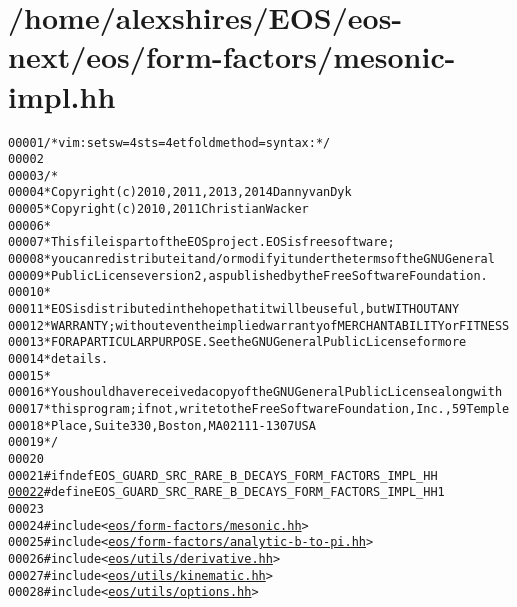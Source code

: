 \hypertarget{mesonic-impl_8hh_source}{
\section{/home/alexshires/EOS/eos-\/next/eos/form-\/factors/mesonic-\/impl.hh}
}


\begin{footnotesize}\begin{alltt}
00001 \textcolor{comment}{/* vim: set sw=4 sts=4 et foldmethod=syntax : */}
00002 
00003 \textcolor{comment}{/*}
00004 \textcolor{comment}{ * Copyright (c) 2010, 2011, 2013, 2014 Danny van Dyk}
00005 \textcolor{comment}{ * Copyright (c) 2010, 2011 Christian Wacker}
00006 \textcolor{comment}{ *}
00007 \textcolor{comment}{ * This file is part of the EOS project. EOS is free software;}
00008 \textcolor{comment}{ * you can redistribute it and/or modify it under the terms of the GNU General}
00009 \textcolor{comment}{ * Public License version 2, as published by the Free Software Foundation.}
00010 \textcolor{comment}{ *}
00011 \textcolor{comment}{ * EOS is distributed in the hope that it will be useful, but WITHOUT ANY}
00012 \textcolor{comment}{ * WARRANTY; without even the implied warranty of MERCHANTABILITY or FITNESS}
00013 \textcolor{comment}{ * FOR A PARTICULAR PURPOSE.  See the GNU General Public License for more}
00014 \textcolor{comment}{ * details.}
00015 \textcolor{comment}{ *}
00016 \textcolor{comment}{ * You should have received a copy of the GNU General Public License along with}
00017 \textcolor{comment}{ * this program; if not, write to the Free Software Foundation, Inc., 59 Temple}
00018 \textcolor{comment}{ * Place, Suite 330, Boston, MA  02111-1307  USA}
00019 \textcolor{comment}{ */}
00020 
00021 \textcolor{preprocessor}{#ifndef EOS\_GUARD\_SRC\_RARE\_B\_DECAYS\_FORM\_FACTORS\_IMPL\_HH}
\hypertarget{mesonic-impl_8hh_source_l00022}{}\hyperlink{mesonic-impl_8hh_ac305f5f6cdbb00fc4d4d3e7b1be06724}{00022} \textcolor{preprocessor}{}\textcolor{preprocessor}{#define EOS\_GUARD\_SRC\_RARE\_B\_DECAYS\_FORM\_FACTORS\_IMPL\_HH 1}
00023 \textcolor{preprocessor}{}
00024 \textcolor{preprocessor}{#include <\hyperlink{mesonic_8hh}{eos/form-factors/mesonic.hh}>}
00025 \textcolor{preprocessor}{#include <\hyperlink{analytic-b-to-pi_8hh}{eos/form-factors/analytic-b-to-pi.hh}>}
00026 \textcolor{preprocessor}{#include <\hyperlink{derivative_8hh}{eos/utils/derivative.hh}>}
00027 \textcolor{preprocessor}{#include <\hyperlink{kinematic_8hh}{eos/utils/kinematic.hh}>}
00028 \textcolor{preprocessor}{#include <\hyperlink{options_8hh}{eos/utils/options.hh}>}

\end{alltt}
\end{footnotesize}
